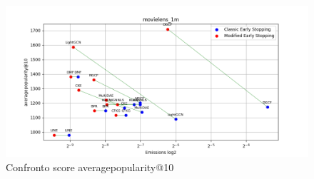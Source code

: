 \begin{figure}[H]
    \centering
    \includegraphics[width=\linewidth, trim=0 0 0 0]{images/averagepopularity@10_movielens_1m_30_7_comparison.png}
    \caption{Confronto score averagepopularity@10}
\end{figure}


